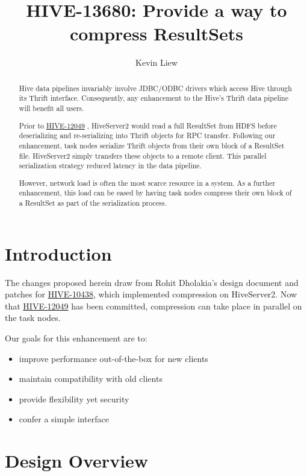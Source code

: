 \documentclass[11pt,a4paper]{article}
\title{HIVE-13680: Provide a way to compress ResultSets}
\author{Kevin Liew}
\begin{document}
\maketitle

\begin{abstract}
	Hive data pipelines invariably involve JDBC/ODBC drivers which access Hive through its Thrift interface. 
	Consequently, any enhancement to the Hive's Thrift data pipeline will benefit all users.
	
	Prior to 
	\href{https://issues.apache.org/jira/browse/HIVE-12049}{HIVE-12049}
	, HiveServer2 would read a full ResultSet from HDFS before deserializing and re-serializing into Thrift objects for RPC transfer.
	Following our enhancement, task nodes serialize Thrift objects from their own block of a ResultSet file. 
	HiveServer2 simply transfers these objects to a remote client. 
	This parallel serialization strategy reduced latency in the data pipeline.
	
	However, network load is often the most scarce resource in a system. 
	As a further enhancement, this load can be eased by having task nodes compress their own block of a ResultSet as part of the serialization process.
\end{abstract}

\section{Introduction}
	The changes proposed herein draw from Rohit Dholakia's design document and patches for
	\href{https://issues.apache.org/jira/browse/HIVE-10438}{HIVE-10438}, which implemented compression on HiveServer2.
	Now that
	\href{https://issues.apache.org/jira/browse/HIVE-12049}{HIVE-12049}
	has been committed, compression can take place in parallel on the task nodes.
	
	Our goals for this enhancement are to:
	\begin{itemize}
		\item improve performance out-of-the-box for new clients
		\item maintain compatibility with old clients
		\item provide flexibility yet security
		\item confer a simple interface
	\end{itemize}
	
\section{Design Overview}
\end{document}

